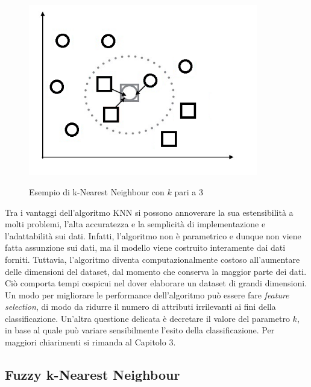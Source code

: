 \documentclass[11pt,  oneside, openany]{book}
\begin{document}
\begin{figure}[h!]
\begin{center}
  \includegraphics[width=10cm]{Immagini/KNN.png}\\
  \caption{Esempio di k-Nearest Neighbour con $k$ pari a 3}
\end{center}
\end{figure}

Tra i vantaggi dell'algoritmo KNN si possono annoverare la sua estensibilità a molti problemi, l'alta accuratezza e la semplicità di implementazione e l'adattabilità sui dati. Infatti, l'algoritmo non è parametrico e dunque non viene fatta assunzione sui dati, ma il modello viene costruito interamente dai dati forniti. Tuttavia, l'algoritmo diventa computazionalmente costoso all'aumentare delle dimensioni del dataset, dal momento che conserva la maggior parte dei dati. Ciò comporta tempi cospicui nel dover elaborare un dataset di grandi dimensioni. Un modo per migliorare le performance dell'algoritmo può essere fare \textit{feature selection}, di modo da ridurre il numero di attributi irrilevanti ai fini della classificazione. Un'altra questione delicata è decretare il valore del parametro $k$, in base al quale può variare sensibilmente l'esito della classificazione. Per maggiori chiarimenti si rimanda al Capitolo 3. 

\subsection{Fuzzy k-Nearest Neighbour}
\end{document}

